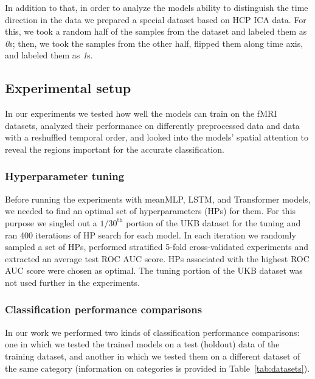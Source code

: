 \documentclass[final,5p,times,twocolumn,authoryear]{elsarticle}
\begin{document}
In addition to that, in order to analyze the models ability to distinguish the time direction in the data we prepared a special dataset based on HCP ICA data. For this, we took a random half of the samples from the dataset and labeled them as \emph{0}s; then, we took the samples from the other half, flipped them along time axis, and labeled them as \emph{1}s.

\subsection{Experimental setup}
In our experiments we tested how well the models can train on the fMRI datasets, analyzed their performance on differently preprocessed data and data with a reshuffled temporal order, and looked into the models' spatial attention to reveal the regions important for the accurate classification.

\subsubsection{Hyperparameter tuning}
Before running the experiments with meanMLP, LSTM, and Transformer models, we needed to find an optimal set of hyperparameters (HPs) for them. For this purpose we singled out a $1/30^\text{th}$ portion of the UKB dataset for the tuning and ran 400 iterations of HP search for each model. In each iteration we randomly sampled a set of HPs, performed stratified 5-fold cross-validated experiments and extracted an average test ROC AUC score. HPs associated with the highest ROC AUC score were chosen as optimal. The tuning portion of the UKB dataset was not used further in the experiments. 

\subsubsection{Classification performance comparisons}\label{sec:general_comparisons_setup}
In our work we performed two kinds of classification performance comparisons: one in which we tested the trained models on a test (holdout) data of the training dataset, and another in which we tested them on a different dataset of the same category (information on categories is provided in Table~\ref{tab:datasets}).
\end{document}
